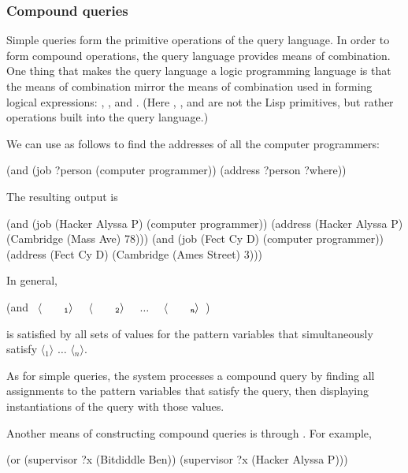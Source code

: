 \subsubsection*{Compound queries}

Simple queries form the primitive operations of the query language.  In order
to form compound operations, the query language provides means of combination.
One thing that makes the query language a logic programming language is that
the means of combination mirror the means of combination used in forming
logical expressions: , , and .  (Here ,
, and  are not the Lisp primitives, but rather operations
built into the query language.)

We can use  as follows to find the addresses of all the computer
programmers:

\begin{codeBlock}
(and (job ?person (computer programmer))
     (address ?person ?where))
\end{codeBlock}

\noindent
The resulting output is

\begin{codeBlock}
(and (job (Hacker Alyssa P) (computer programmer))
     (address (Hacker Alyssa P) (Cambridge (Mass Ave) 78)))
(and (job (Fect Cy D) (computer programmer))
     (address (Fect Cy D) (Cambridge (Ames Street) 3)))
\end{codeBlock}

\noindent
In general,

\begin{codeBlock}
(and ~\(\langle \)~~~~\(_{\mono{1}}\rangle \)~ ~\(\langle \)~~~~\(_{\mono{2}}\rangle \)~ ~\( \dots \)~ ~\(\langle \)~~~~\(_{\monoItalic{n}}\rangle \)~)
\end{codeBlock}

\noindent
is satisfied by all sets of values for the pattern variables that
simultaneously satisfy \( \langle \)\( _1\rangle \) \( \dots \) \( \langle \)\( _n\rangle \).

As for simple queries, the system processes a compound query by finding all
assignments to the pattern variables that satisfy the query, then displaying
instantiations of the query with those values.

Another means of constructing compound queries is through .  For
example,

\begin{codeBlock}
(or (supervisor ?x (Bitdiddle Ben))
    (supervisor ?x (Hacker Alyssa P)))
\end{codeBlock}

